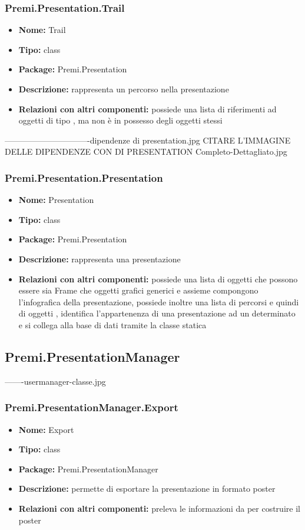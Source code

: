 \subsubsection{Premi.Presentation.Trail}
\begin{itemize}
  \item \textbf{Nome:} Trail
  \item \textbf{Tipo:} class
  \item \textbf{Package:} Premi.Presentation
  \item \textbf{Descrizione:} rappresenta un percorso nella presentazione
  \item \textbf{Relazioni con altri componenti:} possiede una lista di riferimenti ad oggetti di tipo , ma non è in possesso degli oggetti stessi
\end{itemize}
-------------------------------dipendenze di presentation.jpg CITARE L'IMMAGINE DELLE DIPENDENZE CON DI PRESENTATION
Completo-Dettagliato.jpg
\subsubsection{Premi.Presentation.Presentation}
\begin{itemize}
  \item \textbf{Nome:} Presentation
  \item \textbf{Tipo:} class
  \item \textbf{Package:} Premi.Presentation
  \item \textbf{Descrizione:} rappresenta una presentazione
  \item \textbf{Relazioni con altri componenti:} possiede una lista di oggetti  che possono essere sia Frame che oggetti grafici generici e assieme compongono l'infografica della presentazione, possiede inoltre una lista di percorsi e quindi di oggetti , identifica l'appartenenza di una presentazione ad un determinato  e si collega alla base di dati tramite la classe statica 
\end{itemize}



\subsection{Premi.PresentationManager}
-------usermanager-classe.jpg
\subsubsection{Premi.PresentationManager.Export}
\begin{itemize}
  \item \textbf{Nome:} Export 
  \item \textbf{Tipo:} class
  \item \textbf{Package:} Premi.PresentationManager
  \item \textbf{Descrizione:} permette di esportare la presentazione in formato poster
  \item \textbf{Relazioni con altri componenti:} preleva le informazioni da  per costruire il poster
\end{itemize}
